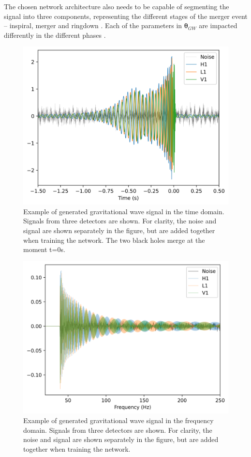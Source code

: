 The chosen network architecture also needs to be capable of segmenting the signal into three components, representing the different stages of the merger event -- inspiral, merger and ringdown \cite{Pan_GW_2014}. Each of the parameters in $\boldsymbol{\theta}_{GW}$ are impacted differently in the different phases \cite{bhardwaj2023peregrine}.

\begin{figure}
  \centering
  \includegraphics[width=1\linewidth]{media/images/obs_time_domain.png}
  \caption{Example of generated gravitational wave signal in the time domain. Signals from three detectors are shown. For clarity, the noise and signal are shown separately in the figure, but are added together when training the network. The two black holes merge at the moment t=0s. }
  \label{fig:obs_time_domain}
\end{figure}

\begin{figure}
  \centering
  \includegraphics[width=1\linewidth]{media/images/obs_frequency_domain.png}
  \caption{Example of generated gravitational wave signal in the frequency domain. Signals from three detectors are shown. For clarity, the noise and signal are shown separately in the figure, but are added together when training the network.}
  \label{fig:obs_freq_domain}
\end{figure}

